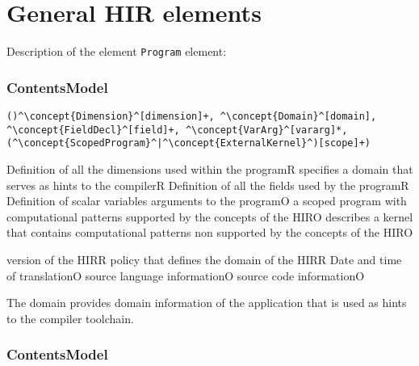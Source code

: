 \section{General HIR elements}


Description of the element {\tt Program} element:

\subsubsection*{ContentsModel}{}

\begin{lstlisting}[style=default]
()^\concept{Dimension}^[dimension]+, ^\concept{Domain}^[domain], ^\concept{FieldDecl}^[field]+, ^\concept{VarArg}^[vararg]*, (^\concept{ScopedProgram}^|^\concept{ExternalKernel}^)[scope]+)
\end{lstlisting}

\begin{HIRChildElements}
{Definition of all the dimensions used within the program}{R}
{specifies a domain that serves as hints to the compiler}{R}
{Definition of all the fields used by the program}{R}
{Definition of scalar variables arguments to the program}{O}
{a scoped program with computational patterns supported by the concepts of the HIR}{O}
{describes a kernel that contains computational patterns non supported by the concepts of the HIR}{O}
\end{HIRChildElements}

\begin{HIRAttributes}
{version of the HIR}{R}
{policy that defines the domain of the HIR}{R}
{Date and time of translation}{O}
{source language information}{O}
{source code information}{O}
\end{HIRAttributes}


The domain provides domain information of the application that is used as hints to the compiler toolchain.

\subsubsection*{ContentsModel}{}

